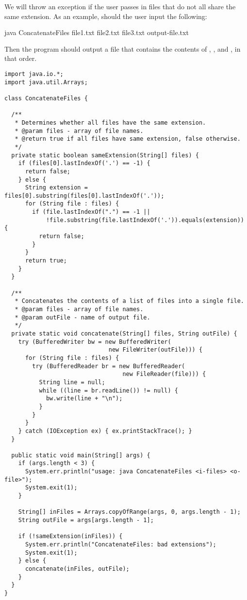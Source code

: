 We will throw an exception if the user passes in files that do not all share the same extension. As an example, should the user input the following:

\begin{verbnobox}[\small]
java ConcatenateFiles file1.txt file2.txt file3.txt output-file.txt
\end{verbnobox}

Then the program should output a file  that contains the contents of , , and , in that order. 

\begin{lstlisting}[language=MyJava]
import java.io.*;
import java.util.Arrays;

class ConcatenateFiles {
 
  /**
   * Determines whether all files have the same extension.
   * @param files - array of file names.
   * @return true if all files have same extension, false otherwise.
   */
  private static boolean sameExtension(String[] files) {
    if (files[0].lastIndexOf('.') == -1) { 
      return false; 
    } else {
      String extension = files[0].substring(files[0].lastIndexOf('.'));
      for (String file : files) {
        if (file.lastIndexOf(".") == -1 || 
            !file.substring(file.lastIndexOf('.')).equals(extension)) { 
          return false; 
        }
      }
      return true;
    }
  }

  /**
   * Concatenates the contents of a list of files into a single file.
   * @param files - array of file names.
   * @param outFile - name of output file.
   */
  private static void concatenate(String[] files, String outFile) {
    try (BufferedWriter bw = new BufferedWriter(
                              new FileWriter(outFile))) {
      for (String file : files) {
        try (BufferedReader br = new BufferedReader(
                                  new FileReader(file))) {
          String line = null;
          while ((line = br.readLine()) != null) { 
            bw.write(line + "\n"); 
          }
        }
      }
    } catch (IOException ex) { ex.printStackTrace(); }
  }

  public static void main(String[] args) {
    if (args.length < 3) {
      System.err.println("usage: java ConcatenateFiles <i-files> <o-file>");
      System.exit(1);
    }

    String[] inFiles = Arrays.copyOfRange(args, 0, args.length - 1);
    String outFile = args[args.length - 1];

    if (!sameExtension(inFiles)) {
      System.err.println("ConcatenateFiles: bad extensions");
      System.exit(1);
    } else {
      concatenate(inFiles, outFile);
    }
  }
}
\end{lstlisting}



